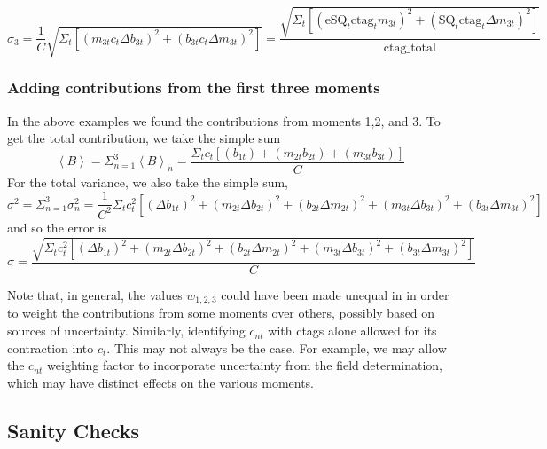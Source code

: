 \documentclass[twoside]{article}
\begin{document}
\begin{equation}
\sigma_{3} =
\frac{1}{C} \sqrt{\Sigma_t  [(m_{3t} c_{t} \Delta b_{3t})^2 + (b_{3t} c_{t} \Delta m_{3t})^2  ]} =
\frac{\sqrt{\Sigma_t  [(\text{eSQ}_t  \text{ctag}_t m_{3t} )^2 + (\text{SQ}_t  \text{ctag}_t \Delta m_{3t})^2  ]} }{\text{ctag\_total}}
\end{equation}


\subsubsection{Adding contributions from the first three moments}
In the above examples we found the contributions from moments 1,2, and 3. To get the total contribution, we take the simple sum
\begin{equation}
\left\langle B \right\rangle =
\Sigma^3_{n=1} \left\langle B \right\rangle_n =
\frac{\Sigma_{t} c_t [(b_{1t}) + (m_{2t} b_{2t}) + (m_{3t} b_{3t})] }{C} 
\end{equation}
For the total variance, we also take the simple sum,
\begin{equation}
\sigma^2 = 
\Sigma^3_{n=1} \sigma^2_n = 
\frac{1}{C^2} \Sigma_t c^2_t [(\Delta b_{1t})^2 +
(m_{2t} \Delta b_{2t})^2 + (b_{2t} \Delta m_{2t})^2 + 
(m_{3t} \Delta b_{3t})^2 + (b_{3t} \Delta m_{3t})^2 
] 
\end{equation}
and so the error is
\begin{equation}
\sigma = 
\frac{\sqrt{\Sigma_t c^2_t [(\Delta b_{1t})^2 +
	(m_{2t} \Delta b_{2t})^2 + (b_{2t} \Delta m_{2t})^2 + 
	(m_{3t} \Delta b_{3t})^2 + (b_{3t} \Delta m_{3t})^2 
	]}}{C}
\end{equation}


Note that, in general, the values $w_{1,2,3}$ could have been made unequal in in order to weight the contributions from some moments over others, possibly based on sources of uncertainty. Similarly, identifying $c_{nt}$ with ctags alone allowed for its contraction into $c_t$. This may not always be the case. For example, we may allow the $c_{nt}$ weighting factor to incorporate uncertainty from the field determination, which may have distinct effects on the various moments.




\newpage
\subsection{Sanity Checks }
\end{document}
